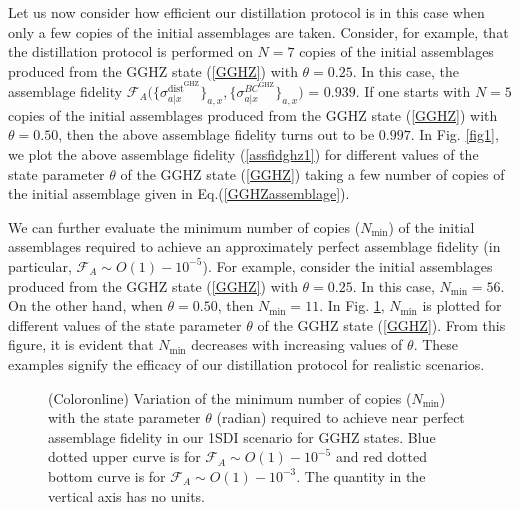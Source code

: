 \documentclass[reprint,superscriptaddress,nofootinbib,amsmath,amssymb,aps,pra,longbibliography]{revtex4-1}
\begin{document}
Let us now consider how efficient our distillation protocol is in this case when only a few copies of the initial assemblages are taken. Consider, for example, that the distillation protocol is performed on $N=7$ copies of the initial assemblages produced from the GGHZ state (\ref{GGHZ}) with $\theta = 0.25$. In this case, the assemblage fidelity $\mathcal{F}_{A} \Big( \{\sigma_{a|x}^{\text{dist}^{\text{GHZ}}} \}_{a,x}, \{\sigma_{a|x}^{BC^{\text{GHZ}}}\}_{a,x} \Big)$ = $0.939$. If one starts with $N=5$ copies of the initial assemblages produced from the GGHZ state (\ref{GGHZ}) with $\theta = 0.50$, then the above assemblage fidelity  turns out to be $0.997$. In Fig. \ref{fig1}, we plot the above assemblage fidelity (\ref{assfidghz1}) for different values of the state parameter $\theta$ of the GGHZ state (\ref{GGHZ}) taking a few number  of copies of the initial assemblage  given in Eq.(\ref{GGHZassemblage}). 

We can further evaluate the minimum number of copies ($N_{\text{min}}$) of the initial assemblages required to achieve an approximately perfect assemblage fidelity  (in particular, $\mathcal{F}_{A} \sim O(1) - 10^{-5}$). For example, consider the initial assemblages produced from the GGHZ state (\ref{GGHZ}) with $\theta = 0.25$.  In this case, $N_{\text{min}} = 56$. On the other hand, when $\theta = 0.50$, then $N_{\text{min}} =11 $. In Fig. \ref{N_min_GGHZ}, $N_{\text{min}}$ is plotted for different values of the state parameter $\theta$ of the GGHZ state (\ref{GGHZ}). From this figure, it is evident that $N_{\text{min}}$ decreases with increasing values of $\theta$. These examples signify the efficacy of our distillation protocol for realistic scenarios.

\begin{figure}[t!]
\caption{\footnotesize (Coloronline)  Variation of the minimum number of copies ($N_{\text{min}}$)  with the state parameter $\theta$ (radian) required to achieve near perfect assemblage fidelity in our 1SDI scenario  for GGHZ states. Blue dotted upper curve is for $\mathcal{F}_{A} \sim O(1) - 10^{-5}$ and red dotted bottom curve is for $\mathcal{F}_{A} \sim O(1) - 10^{-3}$. The quantity in the vertical axis has no units. }   
\label{N_min_GGHZ}
\end{figure}
\end{document}

